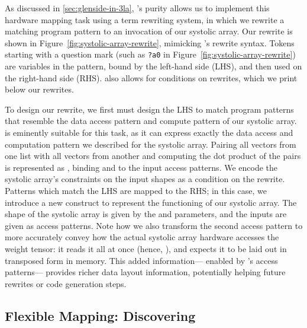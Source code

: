 As discussed in \cref{sec:glenside-in-3la},
  \g's purity
  allows us to implement this hardware mapping task
  using a term rewriting system,
  in which we rewrite a matching program pattern
  to an invocation of our systolic array.
Our rewrite is shown in 
  Figure~\ref{fig:systolic-array-rewrite},
  mimicking
  's rewrite syntax.
Tokens starting with a question mark
  (such as \texttt{?a0} in 
  Figure~\ref{fig:systolic-array-rewrite})
  are variables in the pattern,
  bound by the left-hand side (LHS),
  and then used on the right-hand side (RHS).
 also allows for
  conditions on rewrites,
  which we print below our rewrites.

To design our rewrite,
  we first must design
  the LHS
  to match program patterns
  that resemble the data access pattern
  and compute pattern
  of our systolic array.
\g is eminently suitable for this task,
  as it can express
  exactly the data access
  and computation pattern
  we described
  for the systolic array.
Pairing all vectors from one list
  with all vectors from another
  and computing the dot product
  of the pairs
  is represented as
  ,
  binding
  and 
  to the input access patterns.
We encode
  the systolic array's
  constraints
  on the input shapes
  as a condition on the rewrite.
Patterns which match the LHS
  are mapped to the RHS;
  in this case, we introduce a new
   construct
  to represent the functioning of our systolic array.
The shape of the systolic array 
  is given by the  and 
  parameters,
  and the inputs are given
  as access patterns.
Note how we also transform
  the second access pattern
  to more accurately convey
  how the actual systolic array
  hardware
  accesses the weight tensor:
  it reads it all at once
  (hence, ),
  and expects it to be laid out
  in transposed form
  in memory.
This added information---%
  enabled by \g's access patterns---%
  provides richer data layout information,
  potentially helping future rewrites
  or code generation steps.
 
\subsection{Flexible Mapping: Discovering \itc{}}
\label{sec:discovering-im2col}

